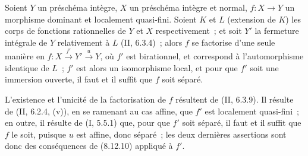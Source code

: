 \begin{corollary}[8.12.11]
Soient $Y$ un préschéma intègre, $X$ un préschéma intègre et normal,
$f:X\to Y$ un morphisme dominant et localement quasi-fini. Soient $K$ et
$L$ (extension de $K$) les corps de fonctions rationnelles de $Y$ et $X$
respectivement~; et soit $Y'$ la fermeture intégrale de $Y$ relativement à
$L$ (II, 6.3.4)~; alors $f$ se factorise d'une seule manière en
$f:X\xrightarrow{f'}Y'\xrightarrow{u}Y$, où $f'$ est birationnel, et
correspond à l'automorphisme identique de $L$~; $f'$ est alors un
isomorphisme local, et pour que $f'$ soit une immersion ouverte, il faut et
il suffit que $f$ soit séparé.
\end{corollary}

L'existence et l'unicité de la factorisation de $f$ résultent de (II, 6.3.9).
Il résulte de (II, 6.2.4, (v)), en se ramenant au cas affine, que $f'$ est
localement quasi-fini~; en outre, il résulte de (I, 5.5.1) que, pour que
$f'$ soit séparé, il faut et il suffit que $f$ le soit, puisque $u$ est
affine, donc séparé~; les deux dernières assertions sont donc des
conséquences de (8.12.10) appliqué à $f'$.


